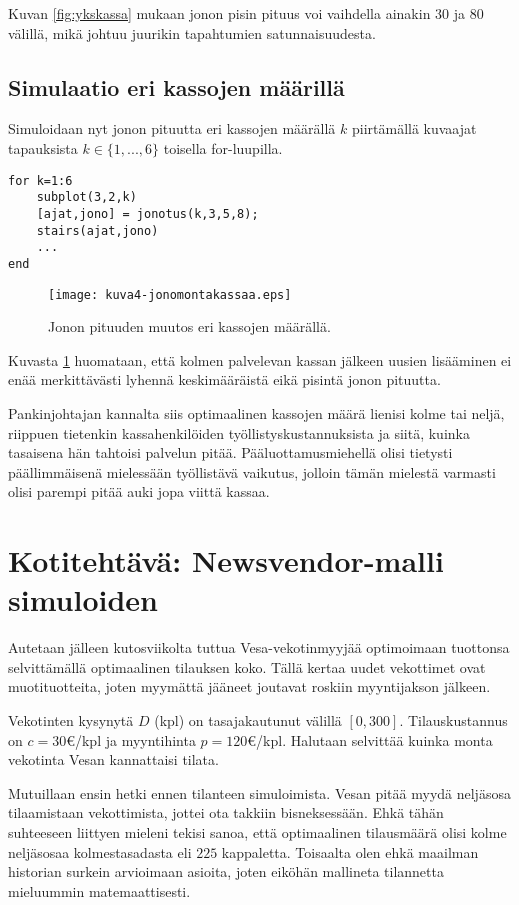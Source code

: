 \documentclass[a4paper,11pt]{article}
\begin{document}
{Kuvan \ref{fig:ykskassa} mukaan jonon pisin pituus voi vaihdella ainakin $30$ ja $80$ välillä, mikä johtuu juurikin tapahtumien satunnaisuudesta. 

\subsection{Simulaatio eri kassojen määrillä}

Simuloidaan nyt jonon pituutta eri kassojen määrällä $k$ piirtämällä kuvaajat tapauksista $k\in\{1,...,6\}$ toisella for-luupilla.

\begin{lstlisting}
for k=1:6
    subplot(3,2,k)
    [ajat,jono] = jonotus(k,3,5,8);
    stairs(ajat,jono)
    ...
end
\end{lstlisting}

\begin{figure}
    \centering
    \texttt{[image: kuva4-jonomontakassaa.eps]}
    \caption{Jonon pituuden muutos eri kassojen määrällä.}
    \label{fig:kassoja}
\end{figure}

Kuvasta \ref{fig:kassoja} huomataan, että kolmen palvelevan kassan jälkeen uusien lisääminen ei enää merkittävästi lyhennä keskimääräistä eikä pisintä jonon pituutta.

Pankinjohtajan kannalta siis optimaalinen kassojen määrä lienisi kolme tai neljä, riippuen tietenkin kassahenkilöiden työllistyskustannuksista ja siitä, kuinka tasaisena hän tahtoisi palvelun pitää. Pääluottamusmiehellä olisi tietysti päällimmäisenä mielessään työllistävä vaikutus, jolloin tämän mielestä varmasti olisi parempi pitää auki jopa viittä kassaa.

\section{Kotitehtävä: Newsvendor-malli simuloiden}

Autetaan jälleen kutosviikolta tuttua Vesa-vekotinmyyjää optimoimaan tuottonsa selvittämällä optimaalinen tilauksen koko. Tällä kertaa uudet vekottimet ovat muotituotteita, joten myymättä jääneet joutavat roskiin myyntijakson jälkeen.

Vekotinten kysynytä $D$ (kpl) on tasajakautunut välillä $[0,300]$. Tilauskustannus on $c=30$\euro/kpl ja myyntihinta $p=120$\euro/kpl. Halutaan selvittää kuinka monta vekotinta Vesan kannattaisi tilata.

Mutuillaan ensin hetki ennen tilanteen simuloimista. Vesan pitää myydä neljäsosa tilaamistaan vekottimista, jottei ota takkiin bisneksessään. Ehkä tähän suhteeseen liittyen mieleni tekisi sanoa, että optimaalinen tilausmäärä olisi kolme neljäsosaa kolmestasadasta eli $225$ kappaletta. Toisaalta olen ehkä maailman historian surkein arvioimaan asioita, joten eiköhän mallineta tilannetta mieluummin matemaattisesti.

}
\end{document}
